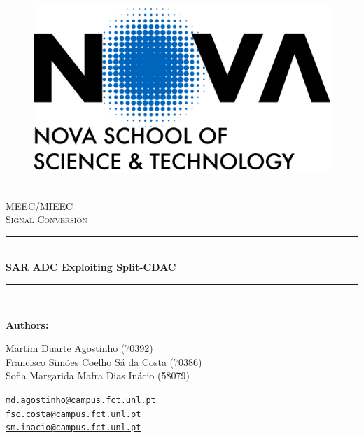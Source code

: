 \documentclass[12pt]{article}
\newcommand{\HRule}{\rule{\linewidth}{0.5mm}} %
\begin{document}

\begin{center}
    \begin{figure}
        \vspace{-1.0cm}
        \includegraphics[scale = 0.055, left]{Images/NovaFctVer.png} %
    \end{figure}

    \mbox{}\\[2.0cm]
    \textsc{\Huge MEEC/MIEEC}\\[2.5cm]
    \textsc{\LARGE Signal Conversion}\\[2.0cm]
    \HRule\\[0.4cm]
    {\large \bf {SAR ADC Exploiting Split-CDAC}}\\[0.2cm]
    \HRule\\[1.5cm]
\end{center}

\begin{flushleft}
    \textbf{Authors:}
\end{flushleft}

\begin{center}
    \begin{minipage}{0.5\textwidth}
        \begin{flushleft}
            Martim Duarte Agostinho (70392)\\
            Francisco Simões Coelho Sá da Costa   (70386)\\
            Sofia Margarida Mafra Dias Inácio (58079)\\
        \end{flushleft}
    \end{minipage}%
    \begin{minipage}{0.5\textwidth}
        \begin{flushright}
            \href{mailto:md.agostinho@campus.fct.unl.pt}{\texttt{md.agostinho@campus.fct.unl.pt}}\\
            \href{mailto:fsc.costa@campus.fct.unl.pt}{\texttt{fsc.costa@campus.fct.unl.pt}}\\
            \href{mailto:sm.inacio@campus.fct.unl.pt}{\texttt{sm.inacio@campus.fct.unl.pt}}
        \end{flushright}
    \end{minipage}
\end{center}
 
\end{document}
